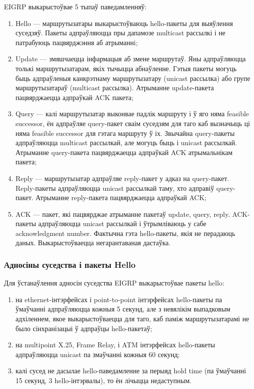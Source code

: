 EIGRP выкарыстоўвае 5 тыпаў паведамленняў:
\begin{enumerate}
    \item Hello --- маршрутызатары выкарыстоўваюць hello-пакеты для выяўлення суседзяў. Пакеты адпраўляюцца пры дапамозе multicast рассылкі і не патрабуюць пацвярджэння аб атрыманнi;
    \item Update --- змяшчаецца інфармацыя аб змене маршрутаў. Яны адпраўляюцца толькі маршрутызатарам, якіх тычыцца абнаўленне. Гэтыя пакеты могуць быць адпраўленыя канкрэтнаму маршрутызатару (unicast рассылка) або групе маршрутызатараў (multicast рассылка). Атрыманне update-пакета пацвярджаецца адпраўкай ACK пакета;
    \item Query --- калі маршрутызатар выконвае падлік маршруту і ў яго няма feasible successor, ён адпраўляе query-пакет сваім суседзям для таго каб вызначыць ці няма feasible successor для гэтага маршруту ў іх. Звычайна query-пакеты адпраўляюцца multicast рассылкай, але могуць быць і unicast рассылкай. Атрыманне query-пакета пацвярджаецца адпраўкай ACK атрымальнікам пакета;
    \item Reply --- маршрутызатар адпраўляе reply-пакет у адказ на query-пакет. Reply-пакеты адпраўляюцца unicast рассылкай таму, хто адправіў query-пакет. Атрыманне reply-пакета пацвярджаецца адпраўкай ACK;
    \item ACK --- пакет, які пацвярджае атрыманне пакетаў update, query, reply. ACK-пакеты адпраўляюцца unicast рассылкай і ўтрымліваюць у сабе acknowledgment number. Фактычна гэта hello-пакеты, якія не перадаюць даных. Выкарыстоўваецца негарантаваная дастаўка.
\end{enumerate}

\subsubsection{Адносіны суседства і пакеты Hello}

Для ўстанаўлення адносін суседства EIGRP выкарыстоўвае пакеты hello:
\begin{enumerate}
    \item на ethernet-інтэрфейсах і point-to-point інтэрфейсах hello-пакеты па ўмаўчанні адпраўляюцца кожныя 5 секунд, але з невялікім выпадковым адхіленнем, якое выкарыстоўваецца для таго, каб паміж маршрутызатарамі не было сінхранізацыі ў адпраўцы hello-пакетаў;
    \item на multipoint X.25, Frame Relay, і ATM інтэрфейсах hello-пакеты адпраўляюцца unicast па змаўчанні кожныя 60 секунд;
    \item калі сусед не дасылае hello-паведамленне за перыяд hold time (па ўмаўчанні 15 секунд, 3 hello-інтэрвалы), то ён лічыцца недаступным.
\end{enumerate}

